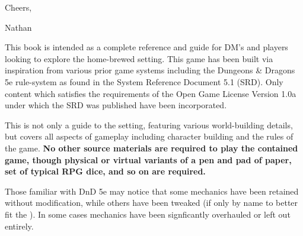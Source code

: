 \documentclass[twoside, 12pt, letterpaper]{report}\usepackage[]{graphicx}\usepackage[]{color}
\begin{document}
\vspace{1cm}
Cheers,

Nathan

\begin{multicols*}{2}
\end{multicols*}
\newpage

\begin{multicols*}{2}
This book is intended as a complete reference and guide for DM's and players looking to explore the home-brewed \nmw setting. This game has been built via inspiration from various prior game systems including the Dungeons \& Dragons 5e rule-system as found in the System Reference Document 5.1 (SRD). Only content which satisfies the requirements of the Open Game License Version 1.0a under which the SRD was published have been incorporated.

This is not only a guide to the \nmw setting, featuring various world-building details, but covers all aspects of gameplay including character building and the rules of the game. \textbf{No other source materials are required to play the contained game, though physical or virtual variants of a pen and pad of paper, set of typical RPG dice, and so on are required.} 

Those familiar with DnD 5e may notice that some mechanics have been retained without modification, while others have been tweaked (if only by name to better fit the \nmw). In some cases mechanics have been signficantly overhauled or left out entirely.


\end{multicols*}
\end{document}
